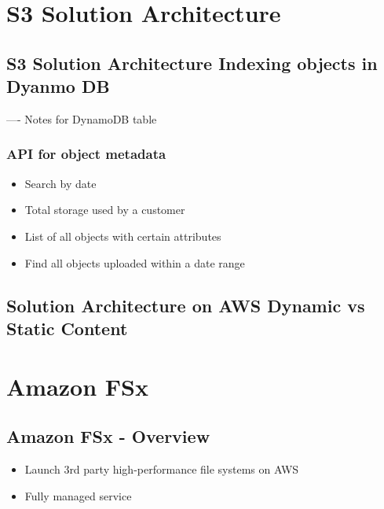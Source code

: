 \section{S3 Solution Architecture}


\subsection{S3 Solution Architecture Indexing objects in Dyanmo DB}
---- Notes for DynamoDB table

\subsubsection{API for object metadata}
\begin{itemize}
    \item Search by date
    \item Total storage used by a customer
    \item List of all objects with certain attributes
    \item Find all objects uploaded within a date range
\end{itemize}

\subsection{Solution Architecture on AWS Dynamic vs Static Content}


\section{Amazon FSx}

\subsection{Amazon FSx - Overview}
\begin{itemize}
    \item Launch 3rd party high-performance file systems on AWS
    \item Fully managed service
\end{itemize}

